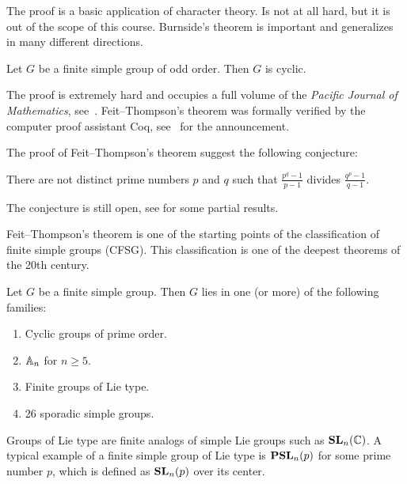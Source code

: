 The proof is a basic application of character theory. 
Is not at all hard, but it is out of the scope of this course. Burnside's theorem
is important and generalizes in many different directions. 

\begin{theorem}
Let $G$ be a finite simple group of odd order. Then $G$ is cyclic. 
\end{theorem}

The proof is extremely hard and occupies a full volume of 
the \emph{Pacific Journal of Mathematics}, see~\cite{MR166261}.  
Feit--Thompson's theorem was formally verified 
by the computer proof assistant Coq, 
see~\cite{MR3111271} for the announcement. 

The proof of Feit--Thompson's theorem suggest the following conjecture:

\begin{conjecture}
There are not distinct prime numbers $p$ and $q$ such that
$\frac {p^{q}-1}{p-1}$ divides $\frac{q^{p} - 1}{q - 1}$. 
\end{conjecture}

The conjecture is still open, see \cite{MR297686} for some partial results. 

Feit--Thompson's theorem is one of the starting points
of the classification of finite simple groups (CFSG). 
This classification is one
of the deepest theorems 
of the 20th century.

\begin{theorem}[CFSG]
Let $G$ be a finite simple group. Then $G$ lies in one (or more) 
of the following families:
\begin{enumerate}
    \item Cyclic groups of prime order.
    \item $\mathbb{A}_n$ for $n\geq5$.
    \item Finite groups of Lie type.
    \item 26 sporadic simple groups.
\end{enumerate}
\end{theorem}

Groups of Lie type are finite analogs of simple Lie groups such as 
$\mathbf{SL}_n(\mathbb{C})$. A typical example
of a finite simple group of Lie type is
$\mathbf{PSL}_n(p)$ for some prime number $p$, which is defined
as $\mathbf{SL}_n(p)$ over its center. 

